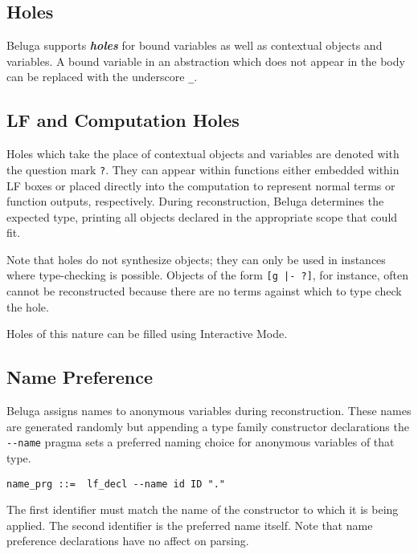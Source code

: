 \documentclass[11pt]{article}
\begin{document}
\subsection{Holes}
Beluga supports \textit{\textbf{holes}} for bound variables as well as contextual objects and variables.
A bound variable in an abstraction which does not appear in the body can be replaced with the underscore \verb+_+.

\subsection{LF and Computation Holes}
Holes which take the place of contextual objects and variables are denoted with the question mark \verb+?+.
They can appear within functions either embedded within LF boxes or placed directly into the computation to represent normal terms or function outputs, respectively.
During reconstruction, Beluga determines the expected type, printing all objects declared in the appropriate scope that could fit.

Note that holes do not synthesize objects; they can only be used in instances where type-checking is possible.
Objects of the form \verb+[g |- ?]+, for instance, often cannot be reconstructed because there are no terms against which to type check the hole.

Holes of this nature can be filled using Interactive Mode.

\subsection{Name Preference}
Beluga assigns names to anonymous variables during reconstruction.
These names are generated randomly but appending a type family constructor declarations the \verb+--name+ pragma sets a preferred naming choice for anonymous variables of that type.
\begin{verbatim}
name_prg ::=  lf_decl --name id ID "."
\end{verbatim}
The first identifier must match the name of the constructor to which it is being applied.
The second identifier is the preferred name itself.
Note that name preference declarations have no affect on parsing.


\end{document}
